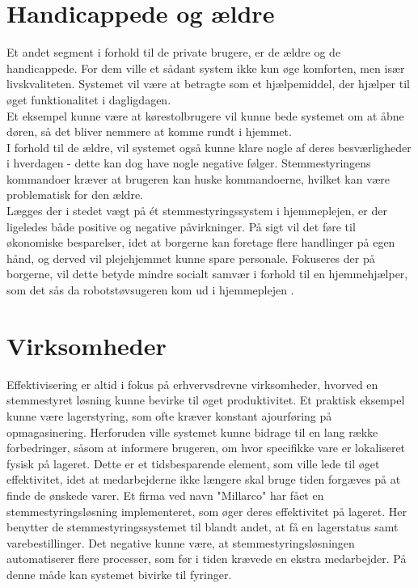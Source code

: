 \section{Handicappede og ældre} 
Et andet segment i forhold til de private brugere, er de ældre og de handicappede. For dem ville et sådant system ikke kun øge komforten, men især livskvaliteten. Systemet vil være at betragte som et hjælpemiddel, der hjælper til øget funktionalitet i dagligdagen.\\Et eksempel kunne være at kørestolbrugere vil kunne bede systemet om at åbne døren, så det bliver nemmere at komme rundt i hjemmet.\\
I forhold til de ældre, vil systemet også kunne klare nogle af deres besværligheder i hverdagen - dette kan dog have nogle negative følger. Stemmestyringens kommandoer kræver at brugeren kan huske kommandoerne, hvilket kan være problematisk for den ældre. \\ 
Lægges der i stedet vægt på ét stemmestyringssystem i hjemmeplejen, er der ligeledes både positive og negative påvirkninger. På sigt vil det føre til økonomiske besparelser, idet at borgerne kan foretage flere handlinger på egen hånd, og derved vil plejehjemmet kunne spare personale. Fokuseres der på borgerne, vil dette betyde mindre socialt samvær i forhold til en hjemmehjælper, som det sås da robotstøvsugeren kom ud i hjemmeplejen \cite{robotstovsuger}.

\section{Virksomheder}
Effektivisering er altid i fokus på erhvervsdrevne virksomheder, hvorved en stemmestyret løsning kunne bevirke til øget produktivitet. Et praktisk eksempel kunne være lagerstyring, som ofte kræver konstant ajourføring på opmagasinering. Herforuden ville systemet kunne bidrage til en lang række forbedringer, såsom at informere brugeren, om hvor specifikke vare er lokaliseret fysisk på lageret. Dette er et tidsbesparende element, som ville lede til øget effektivitet, idet at medarbejderne ikke længere skal bruge tiden forgæves på at finde de ønskede varer. Et firma ved navn "Millarco"\cite{Int-virksomheder} har fået en stemmestyringsløsning implementeret, som øger deres effektivitet på lageret. Her benytter de stemmestyringssystemet til blandt andet, at få en lagerstatus samt varebestillinger. Det negative kunne være, at stemmestyringsløsningen automatiserer flere processer, som før i tiden krævede en ekstra medarbejder. På denne måde kan systemet bivirke til fyringer. \\

